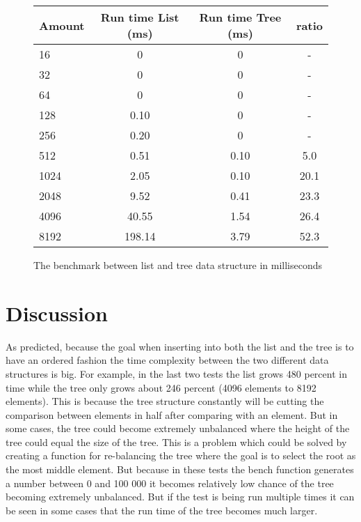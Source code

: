 \documentclass[a4paper,11pt]{article}
\begin{document}
\begin{figure}[H]
\begin{center}
\begin{tabular}{l|c|c|c}
\textbf{Amount} & \textbf{Run time List (ms)} & \textbf{Run time Tree (ms)} & \textbf{ratio}\\
\hline
  16 & 0 & 0 & -\\
  32 & 0 & 0 & -\\
  64 & 0 & 0 & -\\
  128 & 0.10 & 0 & -\\
  256 & 0.20 & 0 & -\\
  512 & 0.51 & 0.10 & 5.0\\
  1024 & 2.05 & 0.10 & 20.1\\
  2048 & 9.52 & 0.41 & 23.3\\
  4096 & 40.55 & 1.54 & 26.4\\
  8192 & 198.14 & 3.79 & 52.3\\
\end{tabular}
\caption{The benchmark between list and tree data structure in milliseconds}
\label{Figure:6}
\end{center}
\end{figure}

\section*{Discussion}
As predicted, because the goal when inserting into both the list and the tree is to have an ordered fashion the time complexity between the two different data structures is big. For example, in the last two tests the list grows 480 percent in time while the tree only grows about 246 percent (4096 elements to 8192 elements). This is because the tree structure constantly will be cutting the comparison between elements in half after comparing with an element. But in some cases, the tree could become extremely unbalanced where the height of the tree could equal the size of the tree. This is a problem which could be solved by creating a function for re-balancing the tree where the goal is to select the root as the most middle element. But because in these tests the bench function generates a number between 0 and 100 000 it becomes relatively low chance of the tree becoming extremely unbalanced. But if the test is being run multiple times it can be seen in some cases that the run time of the tree becomes much larger.
\end{document}
